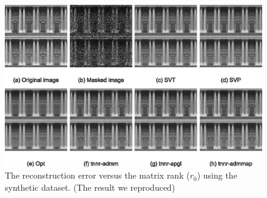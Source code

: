 \documentclass{article}
\begin{document}
{\begin{figure}[ht]
\end{figure}
\begin{figure}[ht]
    \centering
    \includegraphics[]{./assets/fig4.eps}
    \caption{The reconstruction error versus the matrix rank ($r_0$) using the synthetic dataset. (The result we reproduced)\label{fig4}}
\end{figure}

}
\end{document}
